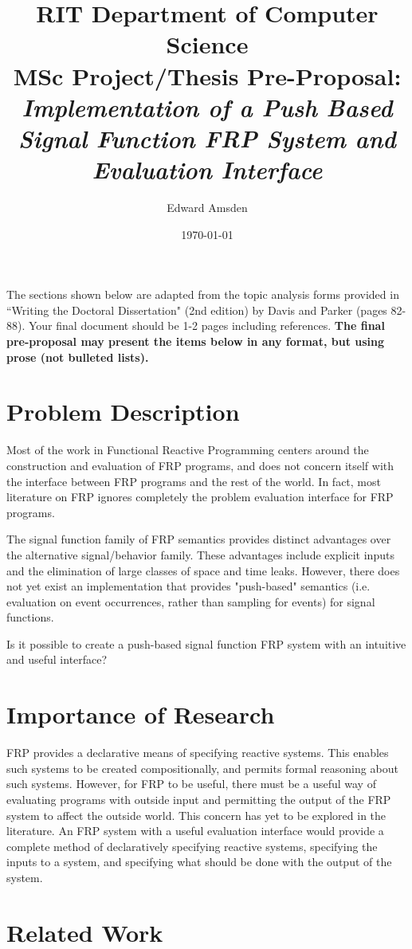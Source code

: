 \documentclass[11pt]{artikel3}
\title{RIT Department of Computer Science\\MSc Project/Thesis Pre-Proposal:\\\emph{Implementation of a Push Based Signal Function FRP System and Evaluation Interface}}
\author{Edward Amsden}
\date{\today}
\begin{document}
\maketitle

The sections shown below are adapted from the topic analysis forms provided in ``Writing the Doctoral Dissertation" (2nd edition) by Davis and Parker (pages 82-88). Your final document should be 1-2 pages including references. {\bf The final pre-proposal may present the items below in any format, but using prose (not bulleted lists).} 

\section{Problem Description}
Most of the work in Functional Reactive Programming centers around the construction and evaluation of FRP programs, and does not concern itself with the interface between FRP programs and the rest of the world. In fact, most literature on FRP ignores completely the problem  evaluation interface for FRP programs. 

The signal function family of FRP semantics provides distinct advantages over the alternative signal/behavior family. These advantages include explicit inputs and the elimination of large classes of space and time leaks. However, there does not yet exist an implementation that provides "push-based" semantics (i.e. evaluation on event occurrences, rather than sampling for events) for signal functions. 

Is it possible to create a push-based signal function FRP system with an intuitive and useful interface?

\section{Importance of Research}
FRP provides a declarative means of specifying reactive systems. This enables such systems to be created compositionally, and permits formal reasoning about such systems. However,
for FRP to be useful, there must be a useful way of evaluating programs with outside input and permitting the output of the FRP system to affect the outside world. This concern has yet to be explored
in the literature. An FRP system with a useful evaluation interface would provide a complete method of declaratively specifying reactive systems, specifying the inputs to a system, and specifying
what should be done with the output of the system.

\section{Related Work}
\end{document}
